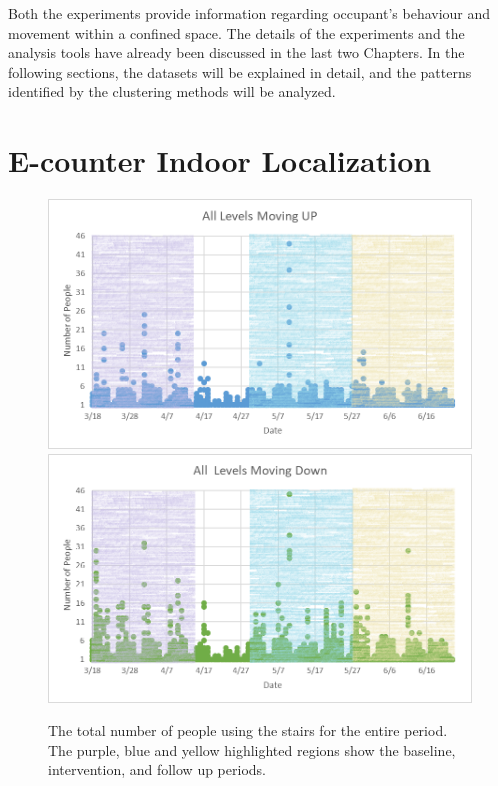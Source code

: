 Both the experiments provide information regarding occupant's behaviour and movement within a confined space. The details of the experiments and the analysis tools have already been discussed in the last two Chapters. In the following sections, the datasets will be explained in detail, and the patterns identified by the clustering methods will be analyzed.

 
\section{E-counter Indoor Localization }

\begin{figure}[!h]
    \includegraphics[width=\textwidth]{image/up.png}\hfill
    \includegraphics[width=\textwidth]{image/down.png}
    \caption{The total number of people using the stairs for the entire period. The purple, blue and yellow highlighted regions show the baseline, intervention, and follow up periods.}
    \label{updown}
\end{figure}

